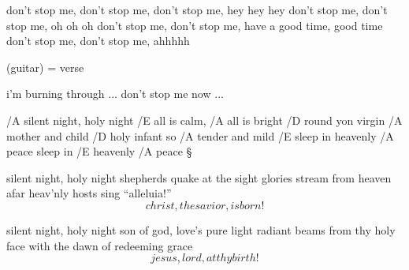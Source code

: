don't stop me, don't stop me, don't stop me, hey hey hey
don't stop me, don't stop me, oh oh oh
don't stop me, don't stop me, have a good time, good time
don't stop me, don't stop me, ahhhhh \s

(guitar)  =  verse

i'm burning through ...
don't stop me now ...



\bye





/A silent night, holy night
/E all is calm, /A all is bright
/D round yon virgin /A mother and child
/D holy infant so /A tender and mild
/E sleep in heavenly /A peace
sleep in /E heavenly /A peace \S

silent night, holy night
shepherds quake at the sight
glories stream from heaven afar
heav'nly hosts sing ``alleluia!''
\[ christ, the savior, is born! \] \s

silent night, holy night
son of god, love's pure light
radiant beams from thy holy face
with the dawn of redeeming grace
\[ jesus, lord, at thy birth! \]



